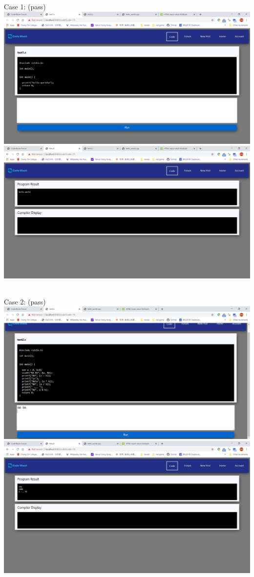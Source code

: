 Case 1: (pass)\\
\includegraphics[scale=0.45]{Doc/Pics/case-7-1-1}\\
\includegraphics[scale=0.45]{Doc/Pics/case-7-1-2}\\

~

Case 2: (pass)\\
\includegraphics[scale=0.45]{Doc/Pics/case-7-2-1}\\
\includegraphics[scale=0.45]{Doc/Pics/case-7-2-2}\\


